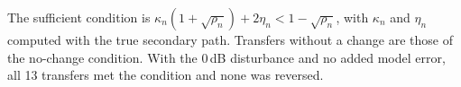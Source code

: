 \begin{table}[tbp]
\centering
\small
\setlength{\tabcolsep}{6pt}
\caption{Transfer decisions checked with the true secondary path. A transfer is reversed when $\rho^{\star}_n \ge 1$.}
\label{tab:atsip-9}
\par\smallskip
{}
\par\medskip
\begin{minipage}{0.98\textwidth}
\footnotesize
The sufficient condition is $\kappa_n(1+\sqrt{\rho_n}) + 2\eta_n < 1-\sqrt{\rho_n}$, with $\kappa_n$ and $\eta_n$ computed with the true secondary path. Transfers without a change are those of the no-change condition. With the 0\,dB disturbance and no added model error, all 13 transfers met the condition and none was reversed.\par
\end{minipage}
\end{table}
